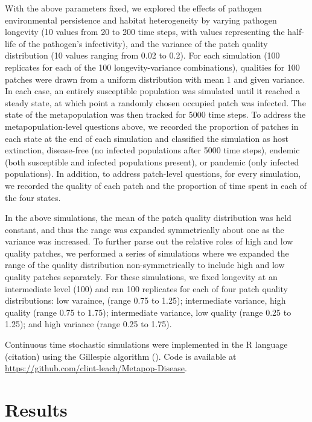 \documentclass{svjour3}
\begin{document}
With the above parameters fixed, we explored the effects of pathogen environmental persistence and habitat heterogeneity by varying pathogen longevity (10 values from 20 to 200 time steps, with values representing the half-life of the pathogen's infectivity), and the variance of the patch quality distribution (10 values ranging from 0.02 to 0.2).  For each simulation (100 replicates for each of the 100 longevity-variance combinations), qualities for 100 patches were drawn from a uniform distribution with mean 1 and given variance. In each case, an entirely susceptible population was simulated until it reached a steady state, at which point a randomly chosen occupied patch was infected.  The state of the metapopulation was then tracked for 5000 time steps.  To address the metapopulation-level questions above, we recorded the proportion of patches in each state at the end of each simulation and classified the simulation as host extinction, disease-free (no infected populations after 5000 time steps), endemic (both susceptible and infected populations present), or pandemic (only infected populations).  In addition, to address patch-level questions, for every simulation, we recorded the quality of each patch and the proportion of time spent in each of the four states.  

In the above simulations, the mean of the patch quality distribution was held constant, and thus the range was expanded symmetrically about one as the variance was increased.  To further parse out the relative roles of high and low quality patches, we performed a series of simulations where we expanded the range of the quality distribution non-symmetrically to include high and low quality patches separately.  For these simulations, we fixed longevity at an intermediate level (100) and ran 100 replicates for each of four patch quality distributions: low varaince, (range 0.75 to 1.25); intermediate variance, high quality (range 0.75 to 1.75); intermediate variance, low quality (range 0.25 to 1.25); and high variance (range 0.25 to 1.75).  

Continuous time stochastic simulations were implemented in the R language (citation) using the Gillespie algorithm (\cite{Gillespie1977}).  Code is available at \url{https://github.com/clint-leach/Metapop-Disease}.

\section{Results}
\label{results}
\end{document}

